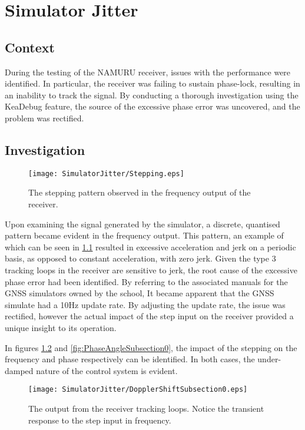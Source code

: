 \chapter{Simulator Jitter}
\label{ch:SimJitter}

\section{Context}
During the testing of the NAMURU receiver, issues with the performance were identified. In particular, the receiver was failing to sustain phase-lock, resulting in an inability to track the signal. By conducting a thorough investigation using the KeaDebug feature, the source of the excessive phase error was uncovered, and the problem was rectified. 

\section{Investigation}

\begin{figure}[!htb] 
    \centering
    \texttt{[image: SimulatorJitter/Stepping.eps]} 
    \caption{The stepping pattern observed in the frequency output of the receiver.}
    \label{fig:Stepping}
\end{figure}

Upon examining the signal generated by the simulator, a discrete, quantised pattern became evident in the frequency output. This pattern, an example of which can be seen in \ref{fig:Stepping} resulted in excessive acceleration and jerk on a periodic basis, as opposed to constant acceleration, with zero jerk. Given the type 3 tracking loops in the receiver are sensitive to jerk, the root cause of the excessive phase error had been identified. By referring to the associated manuals for the GNSS simulators owned by the school, It became apparent that the GNSS simulate had a 10Hz update rate. By adjusting the update rate, the issue was rectified, however the actual impact of the step input on the receiver provided a unique insight to its operation.

In figures \ref{fig:DopplerShiftSubsection0} and \ref{fig:PhaseAngleSubsection0}, the impact of the stepping on the frequency and phase respectively can be identified. In both cases, the under-damped nature of the control system is evident. 

\begin{figure}[!htb] 
    \centering
    \texttt{[image: SimulatorJitter/DopplerShiftSubsection0.eps]} 
    \caption{The output from the receiver tracking loops. Notice the transient response to the step input in frequency.}
    \label{fig:DopplerShiftSubsection0}
\end{figure}


